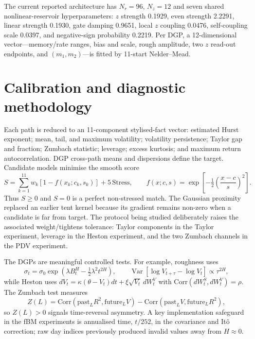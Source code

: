 \documentclass[10pt,a4paper]{article}
\begin{document}
The current reported architecture has $N_r=96$, $N_z=12$ and seven shared nonlinear-reservoir hyperparameters: $z$ strength 0.1929, even strength 2.2291, linear strength 0.1930, gate damping 0.9651, local $z$ coupling 0.0476, self-coupling scale 0.0397, and negative-sign probability 0.2219.  Per DGP, a 12-dimensional vector---memory/rate ranges, bias and scale, rough amplitude, two $z$ read-out endpoints, and $(m_1,m_2)$---is fitted by 11-start Nelder--Mead.

\section{Calibration and diagnostic methodology}
Each path is reduced to an 11-component stylised-fact vector: estimated Hurst exponent; mean, tail, and maximum volatility; volatility persistence; Taylor gap and fraction; Zumbach statistic; leverage; excess kurtosis; and maximum return autocorrelation.  DGP cross-path means and dispersions define the target.  Candidate models minimise the smooth score
\begin{equation}
 S=\sum_{k=1}^{11}w_k\left[1-f(x_k;c_k,s_k)\right]+5\,\mathrm{Stress},\qquad
 f(x;c,s)=\exp\!\left[-\tfrac12\left(\frac{x-c}{s}\right)^2\right]. \tag{5}
\end{equation}
Thus $S\geq0$ and $S=0$ is a perfect non-stressed match.  The Gaussian proximity replaced an earlier tent kernel because its gradient remains non-zero when a candidate is far from target.  The protocol being studied deliberately raises the associated weight/tightens tolerance: Taylor components in the Taylor experiment, leverage in the Heston experiment, and the two Zumbach channels in the PDV experiment.

The DGPs are meaningful controlled tests.  For example, roughness uses
\begin{equation}
 \sigma_t=\sigma_0\exp\!\left(\lambda B_t^H-\tfrac12\lambda^2t^{2H}\right),\qquad
 \operatorname{Var}[\log V_{t+\tau}-\log V_t]\propto\tau^{2H}, \tag{6}
\end{equation}
while Heston uses $dV_t=\kappa(\theta-V_t)dt+\xi\sqrt{V_t}\,dW_t^V$ with $\mathrm{Corr}(dW_t^S,dW_t^V)=\rho$.  The Zumbach test measures
\begin{equation}
 Z(L)=\mathrm{Corr}(\mathrm{past}_L R^2,\mathrm{future}_L V)-\mathrm{Corr}(\mathrm{past}_L V,\mathrm{future}_L R^2), \tag{7}
\end{equation}
so $Z(L)>0$ signals time-reversal asymmetry.  A key implementation safeguard in the fBM experiments is annualised time, $t/252$, in the covariance and It\^o correction; raw day indices previously produced invalid values away from $H\approx0$.
\end{document}
